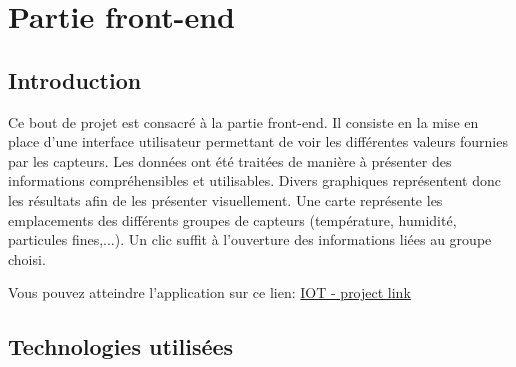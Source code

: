 \chapter{Partie front-end}

\section{Introduction}

Ce bout de projet est consacré à la partie front-end. Il consiste en la mise en place d'une interface utilisateur permettant de voir les différentes valeurs fournies par les capteurs. Les données ont été traitées de manière à présenter des informations compréhensibles et utilisables. Divers graphiques représentent donc les résultats afin de les présenter visuellement. Une carte représente les emplacements des différents groupes de capteurs (température, humidité, particules fines,...). Un clic suffit à l'ouverture des informations liées au groupe choisi.

Vous pouvez atteindre l'application sur ce lien: \href{http://iot_lora.lan.iict.ch/}{IOT - project link}

\section{Technologies utilisées}

